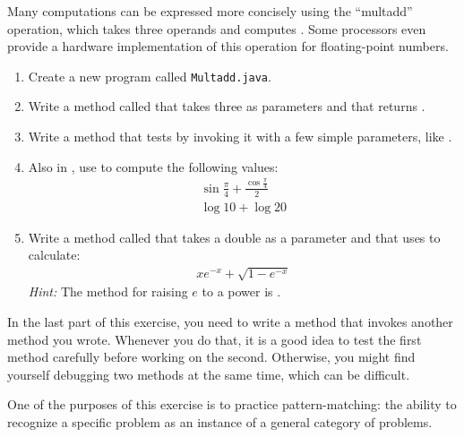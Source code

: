 \begin{exercise}  %

Many computations can be expressed more concisely using the ``multadd'' operation, which takes three operands and computes .
Some processors even provide a hardware implementation of this operation for floating-point numbers.

\begin{enumerate}

\item Create a new program called {\tt Multadd.java}.

\item Write a method called  that takes three  as parameters and that returns .

\item Write a  method that tests  by invoking it with a few simple parameters, like .

\item Also in , use  to compute the following values:
%
\begin{eqnarray*}
& \sin \frac{\pi}{4} + \frac{\cos \frac{\pi}{4}}{2} & \\
& \log 10 + \log 20 &
\end{eqnarray*}

\item Write a method called  that takes a double as a parameter and that uses  to calculate:
%
\begin{eqnarray*}
x e^{-x} + \sqrt{1 - e^{-x}}
\end{eqnarray*}
%
{\it Hint:} The method for raising $e$ to a power is .

\end{enumerate}

In the last part of this exercise, you need to write a method that invokes another method you wrote.
Whenever you do that, it is a good idea to test the first method carefully before working on the second.
Otherwise, you might find yourself debugging two methods at the same time, which can be difficult.

One of the purposes of this exercise is to practice pattern-matching: the ability to recognize a specific problem as an instance of a general category of problems.

\end{exercise}
